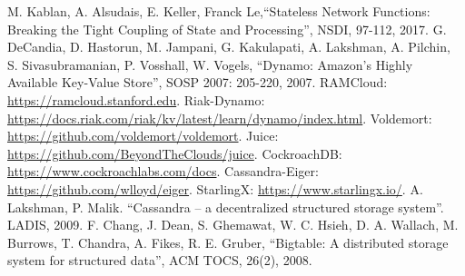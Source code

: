 \documentclass[conference]{IEEEtran}
\begin{document}
\begin{thebibliography}{00}
 M. Kablan, A. Alsudais, E. Keller, Franck Le,``Stateless Network Functions: Breaking the Tight Coupling of State and Processing'', NSDI, 97-112, 2017.
 G. DeCandia, D. Hastorun, M. Jampani, G. Kakulapati, A. Lakshman, A. Pilchin, S. Sivasubramanian, P. Vosshall, W. Vogels, ``Dynamo: Amazon's Highly Available Key-Value Store'', SOSP 2007: 205-220, 2007.
 RAMCloud: \url{https://ramcloud.stanford.edu}.
 Riak-Dynamo: \newline \url{https://docs.riak.com/riak/kv/latest/learn/dynamo/index.html}.
 Voldemort: \url{https://github.com/voldemort/voldemort}.
 Juice: \url{https://github.com/BeyondTheClouds/juice}.
 CockroachDB: \url{https://www.cockroachlabs.com/docs}.
 Cassandra-Eiger: \url{https://github.com/wlloyd/eiger}.
 StarlingX: \url{https://www.starlingx.io/}.
 A. Lakshman, P. Malik. ``Cassandra – a decentralized structured storage system''. LADIS, 2009.
 F. Chang, J. Dean, S. Ghemawat, W. C. Hsieh, D. A. Wallach, M. Burrows, T. Chandra, A. Fikes, R. E. Gruber, ``Bigtable: A distributed storage system for structured data'', ACM TOCS, 26(2), 2008.
\end{thebibliography}
\end{document}
